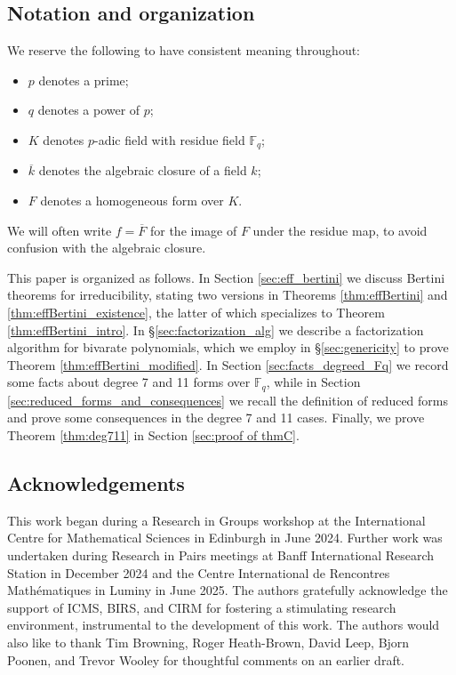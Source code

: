 \documentclass{amsart}
\newcommand{\F}{\mathbb{F}}
\theoremstyle{definition}
\numberwithin{equation}{section}
\numberwithin{table}{section}
\begin{document}
\subsection{Notation and organization} 

We reserve the following to have consistent meaning throughout:
\begin{itemize}
    \item $p$ denotes a prime;
    \item $q$ denotes a power of $p$;
    \item $K$ denotes $p$-adic field with residue field $\F_q$;
    \item $\overline{k}$ denotes the algebraic closure of a field $k$;  
    \item $F$ denotes a homogeneous form over $K$.
\end{itemize}
We will often write $f = \overline{F}$ for the image of $F$ under the residue map, to avoid confusion with the algebraic closure.

This paper is organized as follows. In Section \ref{sec:eff_bertini} we discuss Bertini theorems for irreducibility, stating two versions in Theorems \ref{thm:effBertini} and \ref{thm:effBertini_existence}, the latter of which specializes to Theorem \ref{thm:effBertini_intro}. In \S \ref{sec:factorization_alg} we describe a factorization algorithm for bivarate polynomials, which we employ in \S \ref{sec:genericity} to prove Theorem \ref{thm:effBertini_modified}. In Section \ref{sec:facts_degreed_Fq} we record some facts about degree 7 and 11 forms over $\F_q$, while in Section \ref{sec:reduced_forms_and_consequences} we recall the definition of reduced forms and prove some consequences in the degree 7 and 11 cases. Finally, we prove Theorem \ref{thm:deg711} in Section \ref{sec:proof of thmC}.

\subsection*{Acknowledgements}
This work began during a Research in Groups workshop at the International Centre for Mathematical Sciences in Edinburgh in June 2024. Further work was undertaken during Research in Pairs meetings at Banff International Research Station in December 2024 and the Centre International de Rencontres Mathématiques in Luminy in June 2025. The authors gratefully acknowledge the support of ICMS, BIRS, and CIRM for fostering a stimulating research environment, instrumental to the development of this work. The authors would also like to thank Tim Browning, Roger Heath-Brown, David Leep, Bjorn Poonen, and Trevor Wooley for thoughtful comments on an earlier draft.
\end{document}
